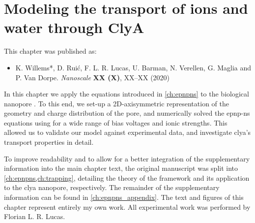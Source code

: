 \chapter{Modeling the transport of ions and water through {ClyA}}
%
\label{ch:transport}
%






%
%
\begin{shaded}
This chapter was published as:
%
\begin{itemize}
  \item K. Willems*, D. Rui\'{c}, F. L. R. Lucas, U. Barman, N. Verellen, G. Maglia and P. Van Dorpe.
        \textit{Nanoscale} \textbf{XX (X)}, XX--XX (2020) %
\end{itemize}
%
\newpage
\end{shaded}
%
%

%

In this chapter we apply the  equations introduced in \cref{ch:epnpns} to the biological
nanopore . To this end, we set-up a 2D-axisymmetric representation of the geometry and charge
distribution of the pore, and numerically solved the \gls{epnp-ns} equations using  for a wide
range of bias voltages and ionic strengths. This allowed us to validate our model against experimental data,
and investigate \gls{clya}'s transport properties in detail.
%

%
To improve readability and to allow for a better integration of the supplementary information into the main
chapter text, the original manuscript was split into \cref{ch:epnpns,ch:trapping}, detailing the theory of the
framework and its application to the \gls{clya} nanopore, respectively. The remainder of the supplementary
information can be found in \cref{ch:epnpns_appendix}. The text and figures of this chapter represent entirely
my own work. All experimental work was performed by Florian L. R. Lucas.
%

